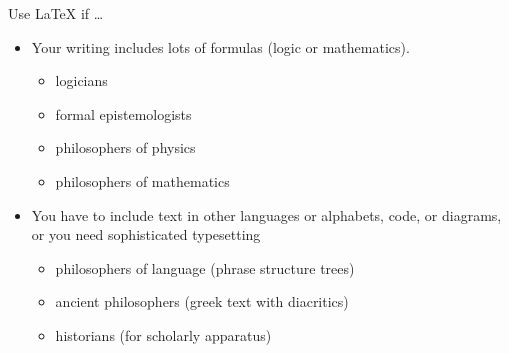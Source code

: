 \begin{frame}{Use \LaTeX{} if \dots }

\begin{itemize}
\item Your writing includes lots of formulas (logic or mathematics). 
  \begin{itemize}
  \item logicians 
  \item formal epistemologists
  \item philosophers of physics
  \item philosophers of mathematics
  \end{itemize}

\item You have to include text in other languages or alphabets, code,
or diagrams, or you need sophisticated typesetting 
\begin{itemize}
\item philosophers of language (phrase structure trees)
\item ancient philosophers (greek text with diacritics)
\item historians (for scholarly apparatus)
\end{itemize}

\end{itemize}

\end{frame}

